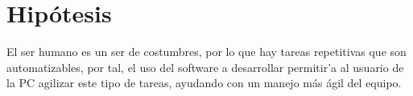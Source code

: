 \section{Hip\'otesis}

El ser humano es un ser de costumbres, por lo que hay tareas repetitivas
 que son automatizables, por tal, el uso del software a desarrollar permitir'a
 al usuario de la PC agilizar este tipo de tareas, ayudando con un manejo m\'as
 \'agil del equipo.
